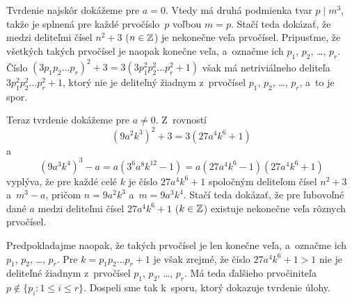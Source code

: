 {%
Tvrdenie najskôr dokážeme pre $a=0$. Vtedy má druhá podmienka tvar ${p\mid m^3}$,
takže je splnená pre každé prvočíslo~$p$ voľbou $m=p$. Stačí teda dokázať, že
medzi deliteľmi čísel $n^2+3$ ($n\in\Bbb Z$) je nekonečne veľa prvočísel.
Pripusťme, že všetkých takých prvočísel je naopak konečne veľa, a~označme
ich $p_1$, $p_2$, \dots, $p_r$. Číslo $(3p_1p_2\ldots p_r)^2+3=3({3p_1^2p_2^2\ldots p_r^2 + 1})$
však má netriviálneho deliteľa $3p_1^2p_2^2\ldots p_r^2 + 1$, ktorý nie je
deliteľný žiadnym z~prvočísel $p_1$, $p_2$, \dots, $p_r$, a~to je spor.

Teraz tvrdenie dokážeme pre $a\ne0$. Z~rovností
$$
(9a^2k^3)^2 + 3 = 3(27a^4k^6+1)
$$
a
$$
(9a^3k^4)^3 - a = a(3^6a^8k^{12}-1) = a(27a^4k^6-1)(27a^4k^6+1)
$$
vyplýva, že pre každé celé $k$ je číslo $27a^4k^6+1$ spoločným
deliteľom čísel $n^2+3$ a~$m^3 - a$, pričom $n=9a^2k^3$ a~$m=9a^3k^4$. Stačí teda dokázať, že
pre ľubovoľné dané $a$ medzi deliteľmi čísel $27a^4k^6 + 1$ ($k\in\Bbb Z$)
existuje nekonečne veľa rôznych prvočísel.

Predpokladajme naopak, že takých prvočísel je len konečne veľa,
a~označme ich $p_1$, $p_2$, \dots, $p_r$. Pre $k=p_1p_2\ldots p_r + 1$ je však
zrejmé, že číslo $27a^4k^6+1>1$ nie je deliteľné žiadnym z~prvočísel
$p_1$, $p_2$, \dots, $p_r$. Má teda ďalšieho prvočiniteľa
$p\notin \{p_i\colon1\le i\le r\}$. Dospeli sme tak k~sporu, ktorý dokazuje
tvrdenie úlohy.}

